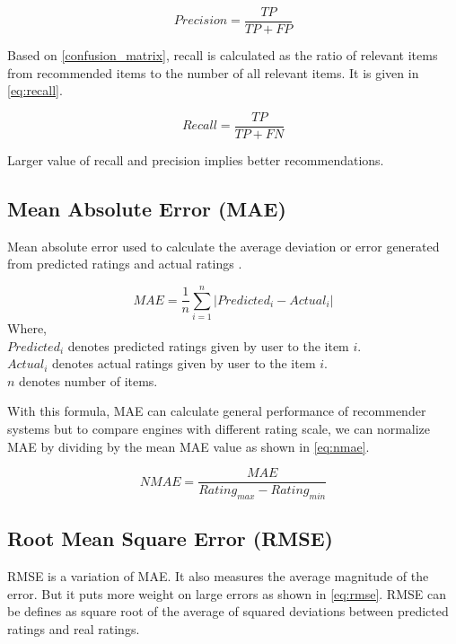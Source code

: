 \begin{equation}
Precision = \frac{TP}{TP + FP} 
\label{eq:precision}
\end{equation}

Based on \autoref{confusion_matrix}, recall is calculated as the ratio of relevant items from recommended items to the number of all relevant items. It is given in \autoref{eq:recall}. 

\begin{equation}
Recall = \frac{TP}{TP + FN} 
\label{eq:recall}
\end{equation}

Larger value of recall and precision implies better recommendations.



\subsection{Mean Absolute Error (MAE)}
Mean absolute error used to calculate the average deviation or error generated from predicted ratings and actual ratings \cite{26}.

\begin{equation}
MAE = \frac{1}{n} \sum_{i=1}^{n}{\vert{Predicted_i - Actual_i} \vert}
\label{eq:mae}
\end{equation}
Where, \\ 
$Predicted_i$ \textsf{ denotes predicted ratings given by user to the item} $i.$ \\
$Actual_i$ \textsf{ denotes actual ratings given by user to the item } $i.$ \\
$n$ \textsf{denotes number of items.}

\noindent With this formula, MAE can calculate general performance of recommender systems but to compare engines with different rating scale, we can normalize MAE by dividing by the mean MAE value as shown in \autoref{eq:nmae}. 

\begin{equation}
NMAE = \frac{MAE} {Rating_{max} - Rating_{min}}
\label{eq:nmae}
\end{equation}


\subsection{Root Mean Square Error (RMSE)}
RMSE is a variation of MAE. It also measures the average magnitude of the error. But it puts more weight on large errors as shown in \autoref{eq:rmse}. RMSE can be defines as square root of the average of squared deviations between predicted ratings and real ratings.

